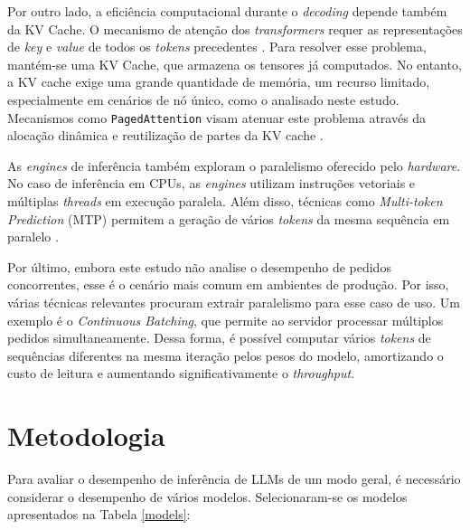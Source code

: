 \documentclass[11pt, a4paper]{article}
\begin{document}
Por outro lado, a eficiência computacional durante o \emph{decoding} depende também da KV Cache.
O mecanismo de atenção dos \emph{transformers} requer as representações de \emph{key} e \emph{value}
de todos os \emph{tokens} precedentes \cite{attention}. Para resolver esse problema, mantém-se uma
KV Cache, que armazena os tensores já computados. No entanto, a KV cache exige uma grande quantidade
de memória, um recurso limitado, especialmente em cenários de nó único, como o analisado neste
estudo. Mecanismos como \texttt{PagedAttention} visam atenuar este problema através da alocação
dinâmica e reutilização de partes da KV cache \cite{paged-attention}.

As \emph{engines} de inferência também exploram o paralelismo oferecido pelo \emph{hardware}. No
caso de inferência em CPUs, as \emph{engines} utilizam instruções vetoriais e múltiplas
\emph{threads} em execução paralela. Além disso, técnicas como \emph{Multi-token Prediction} (MTP)
permitem a geração de vários \emph{tokens} da mesma sequência em paralelo \cite{mlp}.

Por último, embora este estudo não analise o desempenho de pedidos concorrentes, esse é o cenário
mais comum em ambientes de produção. Por isso, várias técnicas relevantes procuram extrair
paralelismo para esse caso de uso. Um exemplo é o \emph{Continuous Batching}, que permite ao
servidor processar múltiplos pedidos simultaneamente. Dessa forma, é possível computar vários
\emph{tokens} de sequências diferentes na mesma iteração pelos pesos do modelo, amortizando o custo
de leitura e aumentando significativamente o \emph{throughput}.

\section{Metodologia} %

Para avaliar o desempenho de inferência de LLMs de um modo geral, é necessário considerar o
desempenho de vários modelos. Selecionaram-se os modelos apresentados na Tabela \ref{models}:
\end{document}
